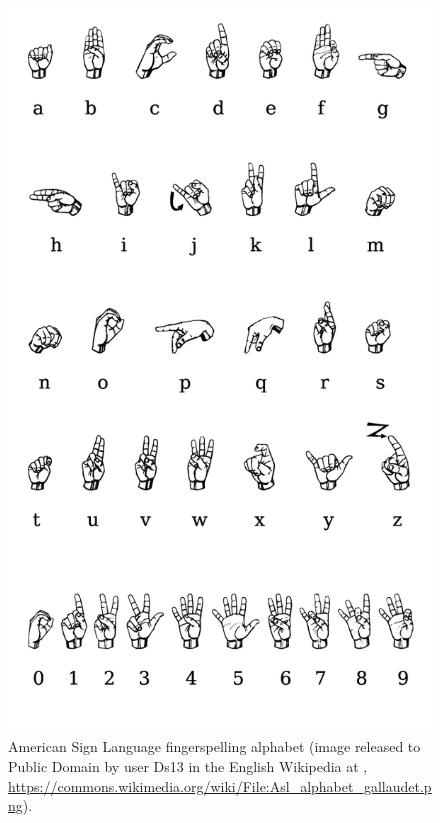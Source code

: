 \documentclass[output=paper]{langsci/langscibook}
\begin{document}
\begin{figure}[tb]
  \centering
  \includegraphics[width=0.5\linewidth]{figures/Asl-alphabet-gallaudet.png}
  \caption[ASL]{American Sign Language fingerspelling alphabet (image released to Public Domain by user Ds13 in the English Wikipedia at , \url{https://commons.wikimedia.org/wiki/File:Asl_alphabet_gallaudet.png}).}
  \label{fig:asl}
\end{figure}
\end{document}
